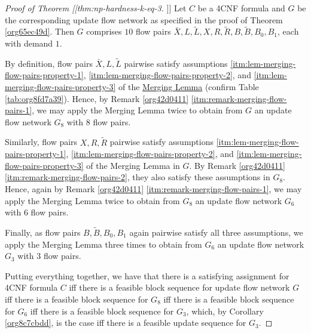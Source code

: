 \documentclass[fontsize=11pt,paper=a4]{book}
\begin{document}
\begin{proof}[Proof of Theorem [[thm:np-hardness-k-eq-3]]]
Let \(C\) be a 4CNF formula and \(G\) be the corresponding update flow network as specified in the proof of Theorem \ref{org65ec49d}.
Then \(G\) comprises \(10\) flow pairs \(\bar{X},L,\tilde{L},X,R,\tilde{R},B,\tilde{B},B_0,B_1\), each with demand \(1\).

By definition, flow pairs \(\bar{X},L,\tilde{L}\) pairwise satisfy assumptions \ref{itm:lem-merging-flow-pairs-property-1}, \ref{itm:lem-merging-flow-pairs-property-2}, and \ref{itm:lem-merging-flow-pairs-property-3} of the \hyperref[orgce7cb77]{Merging Lemma} (confirm Table \ref{tab:org8fd7a39}).
Hence, by Remark \ref{org42d0411} \ref{itm:remark-merging-flow-pairs-1}, we may apply the Merging Lemma twice to obtain from \(G\) an update flow network \(G_8\) with \(8\) flow pairs.

Similarly, flow pairs \(X,R,\tilde{R}\) pairwise satisfy assumptions \ref{itm:lem-merging-flow-pairs-property-1}, \ref{itm:lem-merging-flow-pairs-property-2}, and \ref{itm:lem-merging-flow-pairs-property-3} of the Merging Lemma in \(G\).
By Remark \ref{org42d0411} \ref{itm:remark-merging-flow-pairs-2}, they also satisfy these assumptions in \(G_8\).
Hence, again by Remark \ref{org42d0411} \ref{itm:remark-merging-flow-pairs-1}, we may apply the Merging Lemma twice to obtain from \(G_8\) an update flow network \(G_6\) with \(6\) flow pairs.

Finally, as flow pairs \(B,\tilde{B},B_0,B_1\) again pairwise satisfy all three assumptions, we apply the Merging Lemma three times to obtain from \(G_6\) an update flow network \(G_3\) with \(3\) flow pairs.

Putting everything together, we have that there is a satisfying assignment for 4CNF formula \(C\) iff there is a feasible block sequence for update flow network \(G\) iff there is a feasible block sequence for \(G_8\) iff there is a feasible block sequence for \(G_6\) iff there is a feasible block sequence for \(G_3\), which, by Corollary \ref{org8c7cbdd}, is the case iff there is a feasible update sequence for \(G_3\).
\end{proof}
\end{document}

